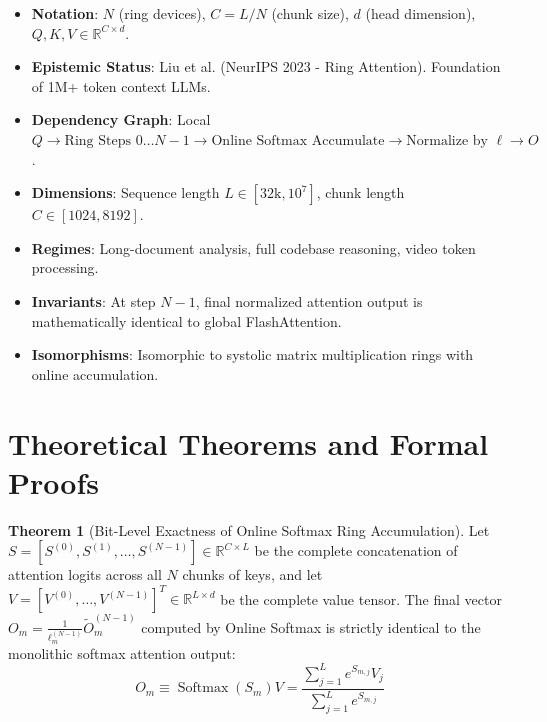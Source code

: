 \documentclass[11pt,a4paper]{article}
\theoremstyle{definition}
\newtheorem{theorem}{\textbf{Theorem}}[section]
\begin{document}
\begin{itemize}
    \item \textbf{Notation}: $N$ (ring devices), $C = L/N$ (chunk size), $d$ (head dimension), $Q, K, V \in \mathbb{R}^{C \times d}$.
    \item \textbf{Epistemic Status}: Liu et al. (NeurIPS 2023 - Ring Attention). Foundation of 1M+ token context LLMs.
    \item \textbf{Dependency Graph}: Local $Q \to \text{Ring Steps } 0 \dots N-1 \to \text{Online Softmax Accumulate} \to \text{Normalize by } \ell \to O$.
    \item \textbf{Dimensions}: Sequence length $L \in [32\text{k}, 10^7]$, chunk length $C \in [1024, 8192]$.
    \item \textbf{Regimes}: Long-document analysis, full codebase reasoning, video token processing.
    \item \textbf{Invariants}: At step $N-1$, final normalized attention output is mathematically identical to global FlashAttention.
    \item \textbf{Isomorphisms}: Isomorphic to systolic matrix multiplication rings with online accumulation.
\end{itemize}

\section{Theoretical Theorems and Formal Proofs}

\begin{theorem}[Bit-Level Exactness of Online Softmax Ring Accumulation]
Let $S = [S^{(0)}, S^{(1)}, \dots, S^{(N-1)}] \in \mathbb{R}^{C \times L}$ be the complete concatenation of attention logits across all $N$ chunks of keys, and let $V = [V^{(0)}, \dots, V^{(N-1)}]^T \in \mathbb{R}^{L \times d}$ be the complete value tensor. The final vector $O_m = \frac{1}{\ell_m^{(N-1)}} \tilde{O}_m^{(N-1)}$ computed by Online Softmax is strictly identical to the monolithic softmax attention output:
{\boldmath
\begin{equation}
O_m \equiv \operatorname{Softmax}(S_m) V = \frac{\sum_{j=1}^L e^{S_{m, j}} V_j}{\sum_{j=1}^L e^{S_{m, j}}}
\end{equation}
}
\end{theorem}
\end{document}
